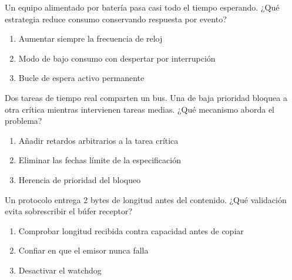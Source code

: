 \noindent\begin{minipage}{\linewidth}\setlength{\parskip}{4pt}\label{q:H-068}
Un equipo alimentado por batería pasa casi todo el tiempo esperando. ¿Qué estrategia reduce consumo conservando respuesta por evento?
\begin{enumerate}[label=\Alph*),nosep]
\item Aumentar siempre la frecuencia de reloj
\item Modo de bajo consumo con despertar por interrupción
\item Bucle de espera activo permanente
\end{enumerate}\end{minipage}\par\medskip

\noindent\begin{minipage}{\linewidth}\setlength{\parskip}{4pt}\label{q:H-069}
Dos tareas de tiempo real comparten un bus. Una de baja prioridad bloquea a otra crítica mientras intervienen tareas medias. ¿Qué mecanismo aborda el problema?
\begin{enumerate}[label=\Alph*),nosep]
\item Añadir retardos arbitrarios a la tarea crítica
\item Eliminar las fechas límite de la especificación
\item Herencia de prioridad del bloqueo
\end{enumerate}\end{minipage}\par\medskip

\noindent\begin{minipage}{\linewidth}\setlength{\parskip}{4pt}\label{q:H-070}
Un protocolo entrega 2 bytes de longitud antes del contenido. ¿Qué validación evita sobrescribir el búfer receptor?
\begin{enumerate}[label=\Alph*),nosep]
\item Comprobar longitud recibida contra capacidad antes de copiar
\item Confiar en que el emisor nunca falla
\item Desactivar el watchdog
\end{enumerate}\end{minipage}\par\medskip

